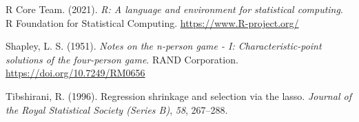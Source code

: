 \documentclass[
  12pt,
]{article}
\newlength{\cslhangindent}
\newlength{\cslentryspacingunit} %
\newenvironment{CSLReferences}[2] %
 {%
  \setlength{\parindent}{0pt}
  \ifodd #1
  \let\oldpar\par
  \def\par{\hangindent=\cslhangindent\oldpar}
  \fi
  \setlength{\parskip}{#2\cslentryspacingunit}
 }%
 {}
\begin{document}
\begin{CSLReferences}{1}{0}
\leavevmode{}%
R Core Team. (2021). \emph{R: A language and environment for statistical
computing}. R Foundation for Statistical Computing.
\url{https://www.R-project.org/}

\leavevmode{}%
Shapley, L. S. (1951). \emph{Notes on the n-person game - {I}:
Characteristic-point solutions of the four-person game}. RAND
Corporation. \url{https://doi.org/10.7249/RM0656}

\leavevmode{}%
Tibshirani, R. (1996). Regression shrinkage and selection via the lasso.
\emph{Journal of the Royal Statistical Society (Series B)}, \emph{58},
267--288.

\end{CSLReferences}
\end{document}
